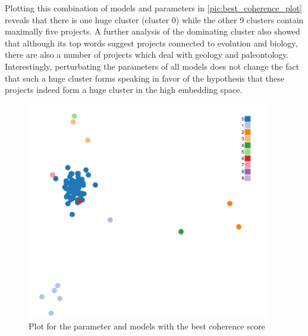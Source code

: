 Plotting this combination of models and parameters in \autoref{pic:best_coherence_plot} reveals that there is one huge cluster (cluster 0) while the other 9 clusters contain maximally five projects. A further analysis of the dominating cluster also showed that although its top words suggest projects connected to evolution and biology, there are also a number of projects which deal with geology and paleontology. Interestingly, perturbating the parameters of all models does not change the fact that such a huge cluster forms speaking in favor of the hypothesis that these projects indeed form a huge cluster in the high embedding space.

\begin{figure}[t]
	\centering
	\includegraphics[width=400px]{../chapters/implementation/pics/best_coherence_plot}
	\caption{\label{pic:best_coherence_plot} Plot for the parameter and models with the best coherence score}
\end{figure}

